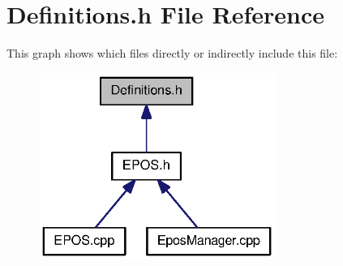 \section{\-Definitions.\-h \-File \-Reference}
\label{Definitions_8h}
\-This graph shows which files directly or indirectly include this file\-:
\nopagebreak
\begin{figure}[H]
\begin{center}
\leavevmode
\includegraphics[width=218pt]{Definitions_8h__dep__incl}
\end{center}
\end{figure}
